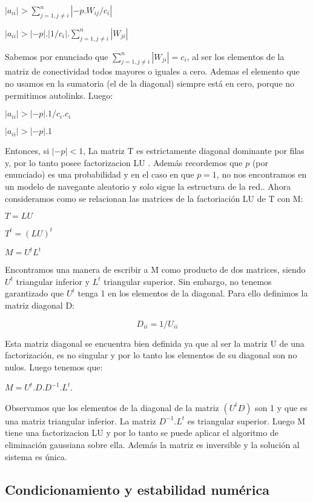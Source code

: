 $   |a_{ii}| > \sum_{j = 1, j \neq i}^n |-p.W_{ij}/c_i| $
    
$   |a_{ii}| > |-p|.|1/c_i|. \sum_{j = 1, j \neq i}^n |W_{ji}|$

Sabemos por enunciado que $\sum_{j = 1, j \neq i}^n |W_{ji}| = c_i$, al ser los elementos de la matriz de conectividad todos mayores o iguales a cero. Ademas el elemento que no usamos en la sumatoria (el de la diagonal) siempre está en cero, porque no permitimos autolinks. Luego:


$   |a_{ii}| > |-p|.1/c_i.c_i$

$   |a_{ii}| > |-p|.1 $

Entonces, si $|-p| < 1$, La matriz T es estrictamente diagonal dominante por filas y, por lo tanto posee factorizacion LU \cite{burden}. Además recordemos que $p$ (por enunciado) es una probabilidad y en el caso en que $p = 1$, no nos encontramos en un modelo de navegante aleatorio y solo sigue la estructura de la red.. Ahora consideramos como se relacionan las matrices de la factoriación LU de T con M: 


$T = LU$ 

$T^t = (LU)^t$ 

$M = U^tL^t$ 

Encontramos una manera de escribir a M como producto de dos matrices, siendo $U^t$ triangular inferior y $L^t$ triangular superior. Sin embargo, no tenemos garantizado que $U^t$ tenga 1 en los elementos de la diagonal. Para ello definimos la matriz diagonal D:

\begin{equation}
    \label{defD}
    D_{ii} = 1/U_{ii} 
\end{equation}

Esta matriz diagonal se encuentra bien definida ya que al ser la matriz U de una factorización, es no singular y por lo tanto los elementos de su diagonal son no nulos. Luego tenemos que:

$M = U^t.D.D^{-1}.L^t$. 

Observamos que los elementos de la diagonal de la matriz $(U^tD)$ son 1 y que es una matriz triangular inferior. La matriz $D^{-1}.L^t$ es triangular superior. Luego M tiene una factorizacion LU y por lo tanto se puede aplicar el algoritmo de eliminación gaussiana sobre ella. Además la matriz es inversible y la solución al sistema es única.

\subsection{Condicionamiento y estabilidad numérica}

